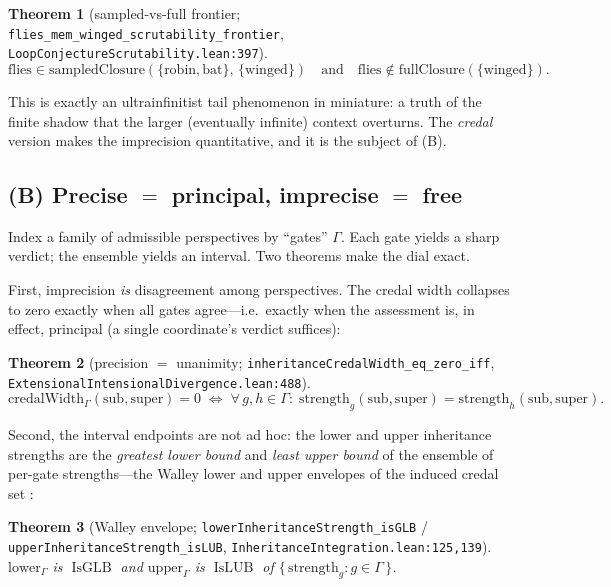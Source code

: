 \documentclass[]{article}
\newtheorem{theorem}{Theorem}
\theoremstyle{definition}
\theoremstyle{remark}
\newcommand{\code}[1]{\texttt{#1}}
\newcommand{\lpath}[1]{{\ttfamily\nolinkurl{#1}}}
\begin{document}
\begin{theorem}[sampled-vs-full frontier; \code{flies\_mem\_winged\_scrutability\_frontier}, \lpath{LoopConjectureScrutability.lean:397}]
\label{thm:flies}
\[
\text{flies}\in \mathrm{sampledClosure}(\{\text{robin},\text{bat}\},\,\{\text{winged}\})
\quad\text{and}\quad
\text{flies}\notin \mathrm{fullClosure}(\{\text{winged}\}).
\]
\end{theorem}

This is exactly an ultrainfinitist tail phenomenon in miniature: a truth of the
finite shadow that the larger (eventually infinite) context overturns. The
\emph{credal} version makes the imprecision quantitative, and it is the subject of
(B).

\subsection{(B) Precise $=$ principal, imprecise $=$ free}
\label{sec:teethB}

Index a family of admissible perspectives by ``gates'' $\Gamma$. Each gate yields a
sharp verdict; the ensemble yields an interval. Two theorems make the dial exact.

First, imprecision \emph{is} disagreement among perspectives. The credal width
collapses to zero exactly when all gates agree---i.e.\ exactly when the assessment
is, in effect, principal (a single coordinate's verdict suffices):

\begin{theorem}[precision $=$ unanimity; \code{inheritanceCredalWidth\_eq\_zero\_iff}, \lpath{ExtensionalIntensionalDivergence.lean:488}]
\label{thm:width}
\[
\mathrm{credalWidth}_\Gamma(\text{sub},\text{super})=0
\;\Longleftrightarrow\;
\forall\,g,h\in\Gamma:\;
\mathrm{strength}_{g}(\text{sub},\text{super})=\mathrm{strength}_{h}(\text{sub},\text{super}).
\]
\end{theorem}

Second, the interval endpoints are not ad hoc: the lower and upper inheritance
strengths are the \emph{greatest lower bound} and \emph{least upper bound} of the
ensemble of per-gate strengths---the Walley lower and upper envelopes of the
induced credal set \cite{Walley1991, Walley1996BagOfMarbles}:

\begin{theorem}[Walley envelope; \code{lowerInheritanceStrength\_isGLB} / \code{upperInheritanceStrength\_isLUB}, \lpath{InheritanceIntegration.lean:125,139}]
\label{thm:env}
$\mathrm{lower}_\Gamma$ is $\operatorname{IsGLB}$ and $\mathrm{upper}_\Gamma$ is
$\operatorname{IsLUB}$ of $\{\,\mathrm{strength}_g : g\in\Gamma\,\}$.
\end{theorem}
\end{document}
